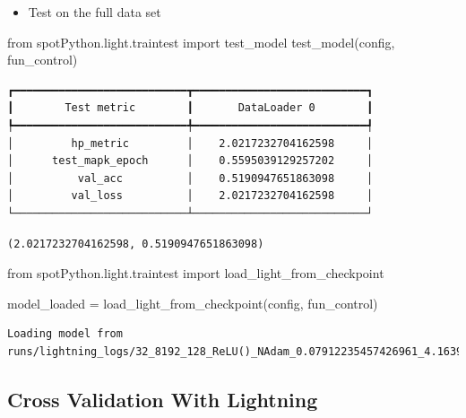 \documentclass[
  letterpaper,
  DIV=11,
  numbers=noendperiod]{scrreprt}
\newenvironment{Shaded}{\begin{snugshade}}{\end{snugshade}}
\newcommand{\ImportTok}[1]{\textcolor[rgb]{0.00,0.46,0.62}{#1}}
\newcommand{\NormalTok}[1]{\textcolor[rgb]{0.00,0.23,0.31}{#1}}
\newcommand{\OperatorTok}[1]{\textcolor[rgb]{0.37,0.37,0.37}{#1}}
\providecommand{\tightlist}{%
  \setlength{\itemsep}{0pt}\setlength{\parskip}{0pt}}\usepackage{longtable,booktabs,array}
\begin{document}
\begin{itemize}
\tightlist
\item
  Test on the full data set
\end{itemize}

\begin{Shaded}
\begin{Highlighting}[]
\ImportTok{from}\NormalTok{ spotPython.light.traintest }\ImportTok{import}\NormalTok{ test\_model}
\NormalTok{test\_model(config, fun\_control)}
\end{Highlighting}
\end{Shaded}

\begin{verbatim}
┏━━━━━━━━━━━━━━━━━━━━━━━━━━━┳━━━━━━━━━━━━━━━━━━━━━━━━━━━┓
┃        Test metric        ┃       DataLoader 0        ┃
┡━━━━━━━━━━━━━━━━━━━━━━━━━━━╇━━━━━━━━━━━━━━━━━━━━━━━━━━━┩
│         hp_metric         │    2.0217232704162598     │
│      test_mapk_epoch      │    0.5595039129257202     │
│          val_acc          │    0.5190947651863098     │
│         val_loss          │    2.0217232704162598     │
└───────────────────────────┴───────────────────────────┘
\end{verbatim}

\begin{verbatim}
(2.0217232704162598, 0.5190947651863098)
\end{verbatim}

\begin{Shaded}
\begin{Highlighting}[]
\ImportTok{from}\NormalTok{ spotPython.light.traintest }\ImportTok{import}\NormalTok{ load\_light\_from\_checkpoint}

\NormalTok{model\_loaded }\OperatorTok{=}\NormalTok{ load\_light\_from\_checkpoint(config, fun\_control)}
\end{Highlighting}
\end{Shaded}

\begin{verbatim}
Loading model from runs/lightning_logs/32_8192_128_ReLU()_NAdam_0.07912235457426961_4.163993340890585_64_Xavier_TEST/checkpoints/last.ckpt
\end{verbatim}

\hypertarget{cross-validation-with-lightning}{%
\subsection{Cross Validation With
Lightning}\label{cross-validation-with-lightning}}
\end{document}
